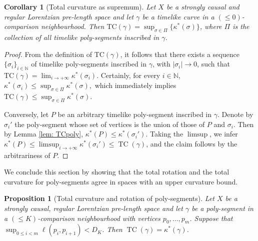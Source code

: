 \documentclass[hidelinks,12pt,a4paper]{article}
\numberwithin{equation}{section}
\theoremstyle{plain}
\newtheorem{proposition}[definition]{Proposition}
\newtheorem{corollary}[definition]{Corollary}
\theoremstyle{definition}
\DeclareMathOperator{\TC}{TC}
\newcommand{\LpLS}{Lo\-rentz\-ian pre-length space }
\begin{document}
\begin{corollary}[Total curvature as supremum]
Let $X$ be a strongly causal and regular \LpLS and let $\gamma$ be a timelike curve in a $(\leq 0)$-comparison neighbourhood. 
Then $ \mathrm {TC}(\gamma)=\sup_{\sigma\in \mathsf{\Pi}}\{ \kappa^*(\sigma)\}$, where $\mathsf{\Pi}$ is the collection of all timelike poly-segments inscribed in $\gamma$.
\end{corollary}

\begin{proof}
From the definition of $\mathrm{TC}(\gamma)$, it follows that there exists a sequence $\{\sigma_i\}_{i\in\mathbb{N}}$ of timelike poly-segments inscribed in $\gamma$, with $|\sigma_i|\to 0$, such that $\mathrm{TC}(\gamma)=\lim_{i\to+\infty} \kappa^*(\sigma_i).$ Certainly, for every $i\in \mathbb{N}$, $\kappa^*(\sigma_i)\leq \sup_{\sigma\in \mathsf{\Pi}} \kappa^*(\sigma),$ which immediately implies $\mathrm{TC}(\gamma)\leq \sup_{\sigma\in \mathsf{\Pi}} \kappa^*(\sigma).$

Conversely, let $P$ be an arbitrary timelike poly-segment inscribed in $\gamma$. 
Denote by $\sigma_i'$ the poly-segment whose set of vertices is the union of those of $P$ and $\sigma_i$. 
Then by Lemma \ref{lem: TCpoly}, $\kappa^*(P) \leq \kappa^*(\sigma_i')$. 
Taking the $\limsup$, we infer $\kappa^*(P) \leq \limsup_{i \rightarrow +\infty} \kappa^*(\sigma_i') \leq \TC(\gamma)$, and the claim follows by the arbitrariness of $P$. 
\end{proof}

We conclude this section by showing that the total rotation and the total curvature for poly-segments agree in spaces with an upper curvature bound.

\begin{proposition}[Total curvature and rotation of poly-segments]
\label{prop: curvatures agree}
Let $X$ be a strongly causal, regular \LpLS and let $\gamma$ be a poly-segment in a $(\leq K)$-comparison neighbourhood with vertices $p_0,\ldots,p_m$. 
Suppose that $\sup_{0\leq i<m} \ell(p_i,p_{i+1}) < D_K$. 
Then $\TC(\gamma)=\kappa^*(\gamma)$. 
\end{proposition}
\end{document}
